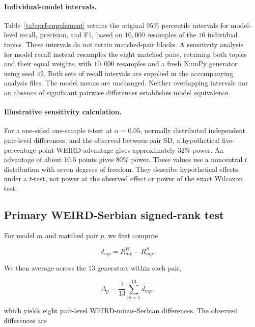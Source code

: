 \documentclass[11pt,a4paper]{article}
\begin{document}
\paragraph{Individual-model intervals.}
Table~\ref{tab:prf-supplement} retains the original $95\%$ percentile intervals for model-level recall, precision, and F1, based on $10{,}000$ resamples of the $16$ individual topics. These intervals do not retain matched-pair blocks. A sensitivity analysis for model recall instead resamples the eight matched pairs, retaining both topics and their equal weights, with $10{,}000$ resamples and a fresh NumPy generator using seed $42$. Both sets of recall intervals are supplied in the accompanying analysis files. The model means are unchanged. Neither overlapping intervals nor an absence of significant pairwise differences establishes model equivalence.

\paragraph{Illustrative sensitivity calculation.}
For a one-sided one-sample $t$-test at $\alpha=0.05$, normally distributed independent pair-level differences, and the observed between-pair SD, a hypothetical five-percentage-point WEIRD advantage gives approximately $32\%$ power. An advantage of about $10.5$ points gives $80\%$ power. These values use a noncentral $t$ distribution with seven degrees of freedom. They describe hypothetical effects under a $t$-test, not power at the observed effect or power of the exact Wilcoxon test.

\subsection{Primary WEIRD-Serbian signed-rank test}
\label{app:primary_wilcoxon}

For model $m$ and matched pair $p$, we first compute

\begin{equation}
 d_{mp}=R^W_{mp}-R^S_{mp}.
\end{equation}

We then average across the $13$ generators within each pair,

\begin{equation}
 \Delta_p=\frac{1}{13}\sum_{m=1}^{13} d_{mp},
\end{equation}

which yields eight pair-level WEIRD-minus-Serbian differences. The observed differences are
\end{document}
